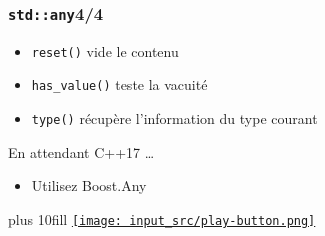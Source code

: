 \documentclass[C++.tex]{subfiles}
\begin{document}
\begin{frame}[fragile]
	\frametitle{\lstinline|std::any|\titlehfill{}4/4}
	\begin{itemize}
		\item \lstinline|reset()| vide le contenu
		\item \lstinline|has_value()| teste la vacuité
		\item \lstinline|type()| récupère l'information du type courant

	\end{itemize}

	\begin{block}{En attendant C++17 \ldots}
		\begin{itemize}
			\item Utilisez Boost.Any
		\end{itemize}
	\end{block}

	\vskip 10mm plus 10fill
	\hfill
	\href{https://godbolt.org/#z:OYLghAFBqd5QCxAYwPYBMCmBRdBLAF1QCcAaPECAMzwBtMA7AQwFtMQByARg9KtQYEAysib0QXACx8BBAKoBnTAAUAHpwAMvAFYTStJg1DIApACYAQuYukl9ZATwDKjdAGFUtAK4sGe1wAyeAyYAHI%2BAEaYxCCSAJykAA6oCoRODB7evnrJqY4CQSHhLFEx8baY9vkMQgRMxASZPn5cFVXptfUEhWGR0bEJCnUNTdmtQ109xaUDAJS2qF7EyOwc5gDMwcjeWADUJutuTkPEmKwH2CYaAIIbWzuY%2B4eGAJ4XV7dmmwzbXnsHbi8jlohDe60uNzuPweTzcaBYiXoqnekJuwQIuxYTGCEFmHxMAHYrDddvsiR9SaShugQCBXrsmE8ACK7LgHYnXSm7am0tBA2EA7kEGl0hgvAD6oiGAPRFwgTFmAsOuzAawArG4GKr2fiSZTGQcWesAHRSHV6qnC3mLDEAwU80USqUEAHoRYRehyhVKtwq9Wa7XrDkU/XM3YEYheTDmzmUh1822He1WkARVCeMSJBAGpPKh2vSVMaWHNOeL2Ku3K7UarVrIO6z6bKi7DQhy0ihM%2BoUigvOmWCctd6sBuvBr6uPBUBtcpjGzAIgwrAHx1ALzDIw5urwe6PguUmjSkXaSY0aPH1i3d638yu%2B/NiwvFtwrtcbtxbnfvcHyiu533D2sY1JQkmWnMkOS5e8XgZMM2QvWN22vRM3GTHsHz7Q5ZW/cwADZvVvfYzDMXYAFpCOIgiACooMfF1MIHbCzDw38UKrf1APgyCU07AiaIw993U9RjmKHdjAwgslQNRWNCQkxDHQZCAHWCcVESYFZxQIF5El3Z9uNXRF11dQTd0ucEjwPI8TzPIC430m8/yvR1aOXfTX2M7chLM7Af1Ekwa3EkMQLA2S2yc%2BkcxZB0sQAa0wcVXlcjsDKRDzPz3b9LOPU9zzkpyeMcviizovTkvczcTK/Hz8McgDAr1YLpOA8lLyghlbPkgrWLvFNSwMWgsxzbqGWNbMFHFAA3MQo1xPyAtHMLIt2NUOvym0uwdPrM2zLtZzGybpswWbb1VP1duNLSdNxY1mDYY7arEhaGoJKTbhej4OHmWhODVXg/A4LRSFQTgUMsaxuUWZZHg2HhSAITRPvmGKQDVQ9vo4SQ/oRoHOF4BQQEPeGAc%2B0g4FgJB10wZAgRIchKHqYAFGUQxKiEBBUAAd3%2B2H4USOgmGqZmQloNnOf%2BwHebofpgC4LgzFISX6GIAB5IFRa57HKeQa5iEZ3HSC12p8H%2B3h%2BEEEQxHYKQZEERQVHUYnSF0VoDCMFBrGsfQ8AifHYFu9hSyGUgJv6bgCV%2B2Z5lQRJqnxjgSOpQ1TDBywuAJUiAHUxFoTP1wjJg8chlY9GpYIhdZ9mNe4XgI0wVZYY54gmESBGvp%2BrHHeBjhsFUKmaeIXZVAADhwkicMkXZgGQZBWS4Y1iIgUGrEsI9cEIEhCPWLhZhr1v5gQM4sBiXFSGR1H9E4THSHF3gu7xgm4b3i%2BODMDvAbvx/icj4PolSZxJCAA%3D}{\texttt{[image: input\_src/play-button.png]}}
\end{frame}
\end{document}
